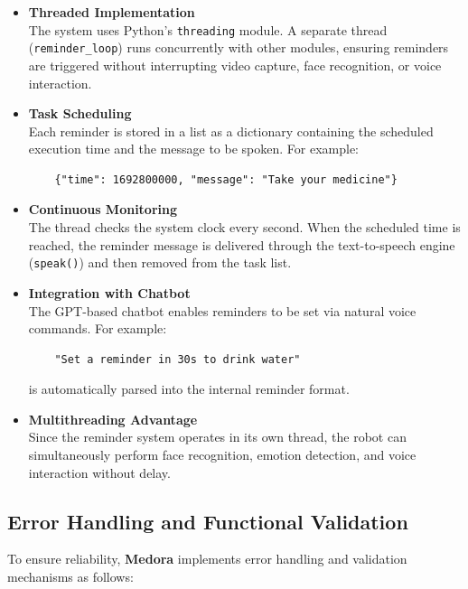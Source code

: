 \begin{itemize}
    \item \textbf{Threaded Implementation} \\
    The system uses Python’s \texttt{threading} module. A separate thread 
    (\texttt{reminder\_loop}) runs concurrently with other modules, ensuring reminders 
    are triggered without interrupting video capture, face recognition, or voice 
    interaction.

    \item \textbf{Task Scheduling} \\
    Each reminder is stored in a list as a dictionary containing the scheduled 
    execution time and the message to be spoken. For example:
    \begin{verbatim}
    {"time": 1692800000, "message": "Take your medicine"}
    \end{verbatim}

    \item \textbf{Continuous Monitoring} \\
    The thread checks the system clock every second. When the scheduled time 
    is reached, the reminder message is delivered through the text-to-speech 
    engine (\texttt{speak()}) and then removed from the task list.

    \item \textbf{Integration with Chatbot} \\
    The GPT-based chatbot enables reminders to be set via natural voice commands. 
    For example:
    \begin{verbatim}
    "Set a reminder in 30s to drink water"
    \end{verbatim}
    is automatically parsed into the internal reminder format.

    \item \textbf{Multithreading Advantage} \\
    Since the reminder system operates in its own thread, the robot can 
    simultaneously perform face recognition, emotion detection, and voice 
    interaction without delay.
\end{itemize}




\subsection{Error Handling and Functional Validation}

To ensure reliability, \textbf{Medora} implements error handling and validation mechanisms as follows:

